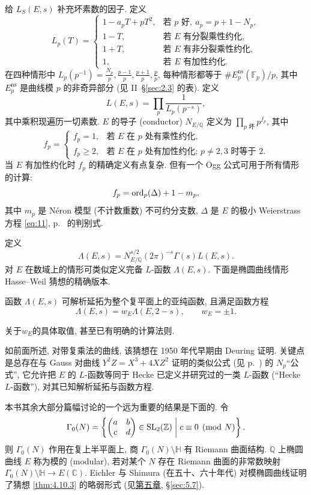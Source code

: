 给 $L_S(E, s)$ 补充坏素数的因子. 定义
\[
L_p(T) = \begin{cases}
1 - a_pT + pT^2, & \text{若 } p \text{ 好},\ a_p = p + 1 - N_p,\\
1 - T, & \text{若 } E \text{ 有分裂乘性约化},\\
1 + T, & \text{若 } E \text{ 有非分裂乘性约化},\\
1, & \text{若 } E \text{ 有加性约化}.
\end{cases}
\]
在四种情形中 $L_p(p^{-1}) = \frac{N_p}{p}, \frac{p-1}{p}, \frac{p+1}{p}, \frac{p}{p}$, 每种情形都等于 $\#E_p^{\mathrm{ns}}(\mathbb{F}_p)/p$, 其中 $E_p^{\mathrm{ns}}$ 是曲线模 $p$ 的非奇异部分 (见 II~\S\ref{sec:2.3} 的表). 定义
\[
L(E, s) = \prod_p\frac{1}{L_p(p^{-s})},
\]
其中乘积现遍历一切素数. $E$ 的导子 (conductor) $N_{E/\mathbb{Q}}$ 定义为 $\prod_{p\text{ 坏}}p^{f_p}$, 其中
\[
f_p = \begin{cases} f_p = 1, & \text{若 } E \text{ 在 } p \text{ 处有乘性约化},\\ f_p\ge 2, & \text{若 } E \text{ 在 } p \text{ 处有加性约化; } p\neq 2, 3 \text{ 时等于 } 2. \end{cases}
\]
当 $E$ 有加性约化时 $f_p$ 的精确定义有点复杂. 但有一个 Ogg 公式可用于所有情形的计算:
\[
f_p = \operatorname*{ord}\nolimits_p(\Delta) + 1 - m_p,
\]
其中 $m_p$ 是 N\'eron 模型 (不计数重数) 不可约分支数, $\Delta$ 是 $E$ 的极小 Weierstrass 方程 \eqref{eq:11}, p.~\pageref{eq:11} 的判别式.

定义
\[
\Lambda(E, s) = N_{E/\mathbb{Q}}^{s/2}(2\pi)^{-s}\Gamma(s)L(E, s).
\]
对 $E$ 在数域上的情形可类似定义完备 $L$-函数 $\Lambda(E, s)$. 下面是椭圆曲线情形 Hasse--Weil 猜想的精确版本.

\begin{conjecture} \label{thm:4.10.3} 
函数 $\Lambda(E, s)$ 可解析延拓为整个复平面上的亚纯函数, 且满足函数方程
\[
\Lambda(E, s) = w_E\Lambda(E, 2-s), \qquad w_E = \pm 1.
\]
\end{conjecture}

关于$w_E$的具体取值, 甚至已有明确的计算法则.

如前面所述, 对带复乘法的曲线, 该猜想在 1950 年代早期由 Deuring 证明. 关键点是总存在与 Gauss 对曲线 $Y^2Z = X^3 + 4XZ^2$ 证明的类似公式 (见 p.~\pageref{para:gauss1814}) 的 $N_p$``公式'', 它允许把 $E$ 的 $L$-函数等同于 Hecke 已定义并研究过的一类 $L$-函数 (``Hecke $L$-函数''), 对其已知解析延拓与函数方程.

本书其余大部分篇幅讨论的一个远为重要的结果是下面的. 令
\[
\Gamma_0(N) = \left\{\begin{pmatrix}a & b\\ c & d\end{pmatrix}\in\operatorname{SL}_2(\mathbb{Z}) \;\middle|\; c\equiv 0\pmod{N}\right\}.
\]
则 $\Gamma_0(N)$ 作用在复上半平面上, 商 $\Gamma_0(N)\setminus\mathbb{H}$ 有 Riemann 曲面结构. $\mathbb{Q}$ 上椭圆曲线 $E$ 称为模的 (modular), 若对某个 $N$ 存在 Riemann 曲面的非常数映射 $\Gamma_0(N)\setminus\mathbb{H}\to E(\mathbb{C})$. Eichler 与 Shimura (在五十、六十年代) 对模椭圆曲线证明了猜想 \ref{thm:4.10.3} 的略弱形式 (见\hyperref[ch:5]{第五章}, \S\ref{sec:5.7}).

